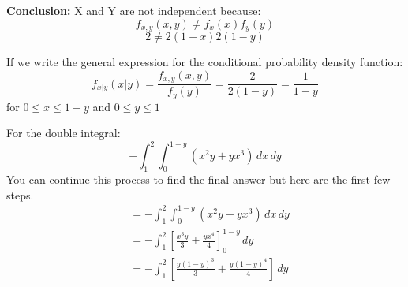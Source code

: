 \documentclass{article}
\begin{document}
       \begin{center}
    \end{center}
       
    \textbf{Conclusion:} X and Y are not independent because:
    \[f_{x,y}(x,y) \neq f_x(x)f_y(y)\]
    \[2 \neq 2(1-x)2(1-y)\]


    If we write the general expression for the conditional probability density function:
    \[
        f_{x|y}(x|y) = \frac{f_{x,y}(x,y)}{f_y(y)} = \frac{2}{2(1-y)} = \frac{1}{1-y}
    \]
    for $0 \leq x \leq 1-y$ and $0 \leq y \leq 1$

    For the double integral:
    \[
        -\int_{1}^{2} \int_{0}^{1-y} (x^2y+yx^3) \, dx \, dy
    \]
    You can continue this process to find the final answer but here are the first few steps.
    \begin{align*}
        &= -\int_{1}^{2} \int_{0}^{1-y} (x^2y+yx^3) \, dx \, dy \\[1ex]
        &= -\int_{1}^{2} \left[\frac{x^3y}{3} + \frac{yx^4}{4}\right]_{0}^{1-y} \, dy \\[1ex]
        &= -\int_{1}^{2} \left[\frac{y(1-y)^3}{3} + \frac{y(1-y)^4}{4}\right] \, dy \\[1ex]
    \end{align*}
\end{document}
